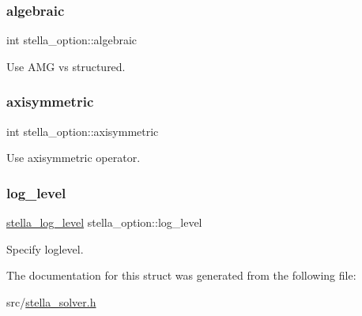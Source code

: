 \subsubsection{\texorpdfstring{algebraic}{algebraic}}
{\footnotesize\ttfamily int stella\+\_\+option\+::algebraic}



Use A\+MG vs structured. 

\mbox{\label{structstella__option_af39b798655aad250875e43e1158e0d8b}} 
\subsubsection{\texorpdfstring{axisymmetric}{axisymmetric}}
{\footnotesize\ttfamily int stella\+\_\+option\+::axisymmetric}



Use axisymmetric operator. 

\mbox{\label{structstella__option_a353548174d60832887cd03f7b586936a}} 
\subsubsection{\texorpdfstring{log\+\_\+level}{log\_level}}
{\footnotesize\ttfamily \mbox{\hyperlink{stella__solver_8h_a6c4b3df31b9f233a9da63b147ed761d0}{stella\+\_\+log\+\_\+level}} stella\+\_\+option\+::log\+\_\+level}



Specify loglevel. 



The documentation for this struct was generated from the following file\+:\begin{DoxyCompactItemize}
\item 
src/\mbox{\hyperlink{stella__solver_8h}{stella\+\_\+solver.\+h}}\end{DoxyCompactItemize}
